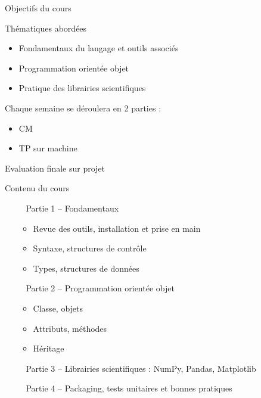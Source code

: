 \documentclass[10pt]{beamer}
\begin{document}
\maketitle

\begin{frame}{Objectifs du cours}

\begin{block}{Thématiques abordées}
\medskip
\begin{itemize}
  \item Fondamentaux du langage et outils associés
  \item Programmation orientée objet
  \item Pratique des librairies scientifiques
\end{itemize}
\end{block}


Chaque semaine se déroulera en 2 parties :
\begin{itemize}
  \item CM
  \item TP sur machine
\end{itemize}

Evaluation finale sur projet
\end{frame}


\begin{frame}{Contenu du cours}
  \begin{enumerate}
    \item[\textcolor{white}{a}] Partie 1 -- Fondamentaux
    \begin{itemize}
      \item Revue des outils, installation et prise en main
      \item Syntaxe, structures de contrôle
      \item Types, structures de données
    \end{itemize}
    \item[\textcolor{white}{a}] Partie 2 -- Programmation orientée objet
    \begin{itemize}
      \item Classe, objets
      \item Attributs, méthodes
      \item Héritage
    \end{itemize}
    \item[\textcolor{white}{a}] Partie 3 -- Librairies scientifiques : NumPy, Pandas, Matplotlib
    \item[\textcolor{white}{a}] Partie 4 -- Packaging, tests unitaires et bonnes pratiques
  \end{enumerate}

\end{frame}
\end{document}
